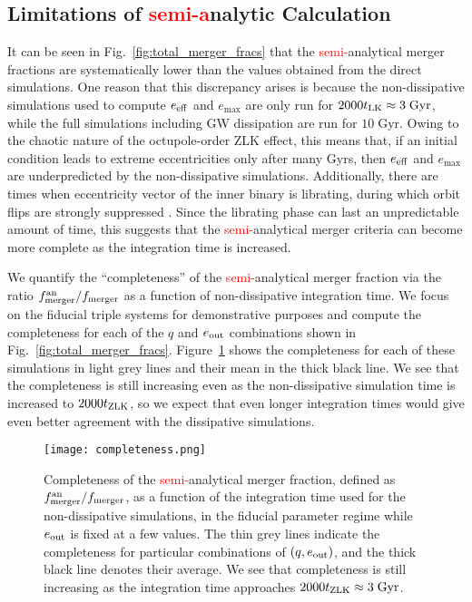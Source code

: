 \documentclass[
        fleqn,
        usenatbib,
    ]{mnras}
\begin{document}
\subsection{Limitations of \textcolor{red}{semi-a}nalytic
Calculation}\label{ss:completeness}

It can be seen in Fig.~\ref{fig:total_merger_fracs} that the
\textcolor{red}{semi-}analytical merger fractions are systematically lower than
the values obtained from the direct simulations. One reason that this
discrepancy arises is because the non-dissipative simulations used to compute
$e_{\rm eff}$ and $e_{\max}$ are only run for $2000 t_{\rm LK} \approx
3\;\mathrm{Gyr}$, while the full simulations including GW dissipation are run
for $10\;\mathrm{Gyr}$. Owing to the chaotic nature of the octupole-order ZLK
effect, this means that, if an initial condition leads to extreme eccentricities
only after many Gyrs, then $e_{\rm eff}$ and $e_{\max}$ are underpredicted by
the non-dissipative simulations. Additionally, there are times when eccentricity
vector of the inner binary is librating, during which orbit flips are strongly
suppressed \citep{katz2011long}. Since the librating phase can last an
unpredictable amount of time, this suggests that the
\textcolor{red}{semi-}analytical merger criteria can become more complete as the
integration time is increased.

We quantify the ``completeness'' of the \textcolor{red}{semi-}analytical merger
fraction via the ratio $f_{\rm merger}^{\rm an} / f_{\rm merger}$ as a function
of non-dissipative integration time. We focus on the fiducial triple systems for
demonstrative purposes and compute the completeness for each of the $q$ and
$e_{\rm out}$ combinations shown in Fig.~\ref{fig:total_merger_fracs}.
Figure~\ref{fig:completeness} shows the completeness for each of these
simulations in light grey lines and their mean in the thick black line. We see
that the completeness is still increasing even as the non-dissipative simulation
time is increased to $2000t_{\rm ZLK}$, so we expect that even longer
integration times would give even better agreement with the dissipative
simulations.
\begin{figure}
    \centering
    \texttt{[image: completeness.png]}
    \caption{Completeness of the \textcolor{red}{semi-}analytical merger fraction, defined as $f_{\rm
    merger}^{\rm an} / f_{\rm merger}$, as a function of the integration time
    used for the non-dissipative simulations, in the fiducial parameter regime
    while $e_{\rm out}$ is fixed at a few values. The thin grey lines indicate
    the completeness for particular combinations of $(q, e_{\rm out})$, and the
    thick black line denotes their average. We see that completeness is still
    increasing as the integration time approaches $2000 t_{\rm ZLK} \approx
    3\;\mathrm{Gyr}$. }\label{fig:completeness}
\end{figure}
\end{document}
